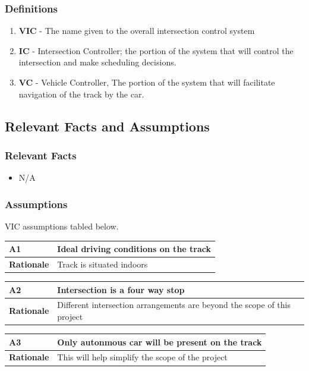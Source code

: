 \documentclass [11pt]{article}
\begin{document}
\subsubsection{Definitions}
\begin{enumerate}
	\itemsep0pt
	\item \textbf{VIC} - The name given to the overall intersection control system
	\item \textbf{IC} - Intersection Controller; the portion of the system that will control the intersection and make scheduling decisions. 
	\item \textbf{VC} - Vehicle Controller, The portion of the system that will facilitate navigation of the track by the car. 
\end{enumerate}

	
\subsection{Relevant Facts and Assumptions} 

\subsubsection{Relevant Facts}
\begin{itemize}
	\item N/A
\end{itemize}

\subsubsection{Assumptions}
VIC assumptions tabled below. 
\begin{longtable}{| p{ } | p{ } | }\hline 
\rowcolor{tableCell}\textbf{A1} & Ideal driving conditions on the track \\ \hline
\textbf{Rationale} & Track is situated indoors \\ \hline 
\end{longtable}

\begin{longtable}{| p{ } | p{ } | }\hline 
\rowcolor{tableCell}\textbf{A2} & Intersection is a four way stop \\ \hline
\textbf{Rationale} &  Different intersection arrangements are beyond the scope of this project \\ \hline
\end{longtable}

\begin{longtable}{| p{ } | p{ } | }\hline 
\rowcolor{tableCell}\textbf{A3} & Only autonmous car will be present on the track \\ \hline
\textbf{Rationale} &  This will help simplify the scope of the project\\ \hline
\end{longtable}
\end{document}
